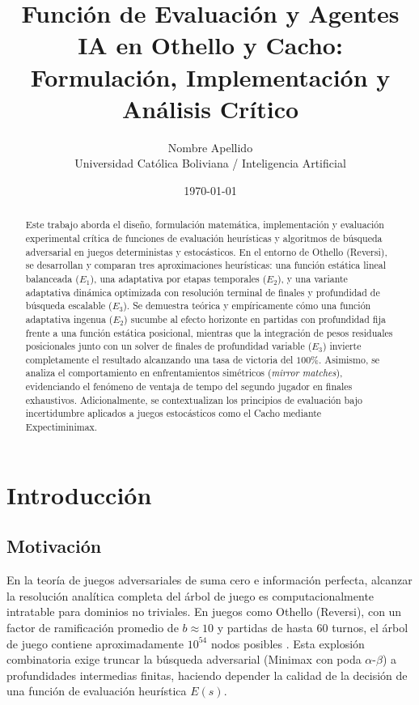 \documentclass[10pt,a4paper]{article}
\title{Función de Evaluación y Agentes IA en Othello y Cacho: \\
Formulación, Implementación y Análisis Crítico}
\author{Nombre Apellido \\ Universidad Católica Boliviana / Inteligencia Artificial}
\date{\today}
\begin{document}
\maketitle

\begin{abstract}
Este trabajo aborda el diseño, formulación matemática, implementación y evaluación experimental crítica de funciones de evaluación heurísticas y algoritmos de búsqueda adversarial en juegos deterministas y estocásticos. En el entorno de Othello (Reversi), se desarrollan y comparan tres aproximaciones heurísticas: una función estática lineal balanceada ($E_1$), una adaptativa por etapas temporales ($E_2$), y una variante adaptativa dinámica optimizada con resolución terminal de finales y profundidad de búsqueda escalable ($E_3$). Se demuestra teórica y empíricamente cómo una función adaptativa ingenua ($E_2$) sucumbe al efecto horizonte en partidas con profundidad fija frente a una función estática posicional, mientras que la integración de pesos residuales posicionales junto con un solver de finales de profundidad variable ($E_3$) invierte completamente el resultado alcanzando una tasa de victoria del $100\%$. Asimismo, se analiza el comportamiento en enfrentamientos simétricos (\textit{mirror matches}), evidenciando el fenómeno de ventaja de tempo del segundo jugador en finales exhaustivos. Adicionalmente, se contextualizan los principios de evaluación bajo incertidumbre aplicados a juegos estocásticos como el Cacho mediante Expectiminimax.
\end{abstract}

\section{Introducción}

\subsection{Motivación}
En la teoría de juegos adversariales de suma cero e información perfecta, alcanzar la resolución analítica completa del árbol de juego es computacionalmente intratable para dominios no triviales. En juegos como Othello (Reversi), con un factor de ramificación promedio de $b \approx 10$ y partidas de hasta 60 turnos, el árbol de juego contiene aproximadamente $10^{54}$ nodos posibles \cite{russell2020artificial}. Esta explosión combinatoria exige truncar la búsqueda adversarial (Minimax con poda $\alpha$-$\beta$) a profundidades intermedias finitas, haciendo depender la calidad de la decisión de una función de evaluación heurística $E(s)$. 
\end{document}
